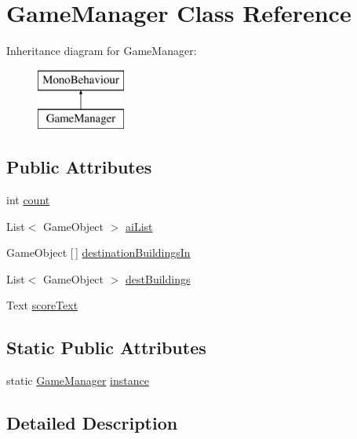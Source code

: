 \hypertarget{class_game_manager}{}\section{Game\+Manager Class Reference}
\label{class_game_manager}
Inheritance diagram for Game\+Manager\+:\begin{figure}[H]
\begin{center}
\leavevmode
\includegraphics[height=2.000000cm]{class_game_manager}
\end{center}
\end{figure}
\subsection*{Public Attributes}
\begin{DoxyCompactItemize}
\item 
int \hyperlink{class_game_manager_ab49abc66427bbe2c6c1c8a38b58bafae}{count}
\item 
List$<$ Game\+Object $>$ \hyperlink{class_game_manager_ae36910f35ee71379d3f60e9fade57abc}{ai\+List}
\item 
Game\+Object \mbox{[}$\,$\mbox{]} \hyperlink{class_game_manager_a9400f161998957696533cc5e7925d9a1}{destination\+Buildings\+In}
\item 
List$<$ Game\+Object $>$ \hyperlink{class_game_manager_a7207a32a9e7c552a999a850b2bc82579}{dest\+Buildings}
\item 
Text \hyperlink{class_game_manager_a398d163978e15786ef9cea1be1c877d9}{score\+Text}
\end{DoxyCompactItemize}
\subsection*{Static Public Attributes}
\begin{DoxyCompactItemize}
\item 
static \hyperlink{class_game_manager}{Game\+Manager} \hyperlink{class_game_manager_a7666e8468dac197b9eb32dd32128524f}{instance}
\end{DoxyCompactItemize}


\subsection{Detailed Description}


